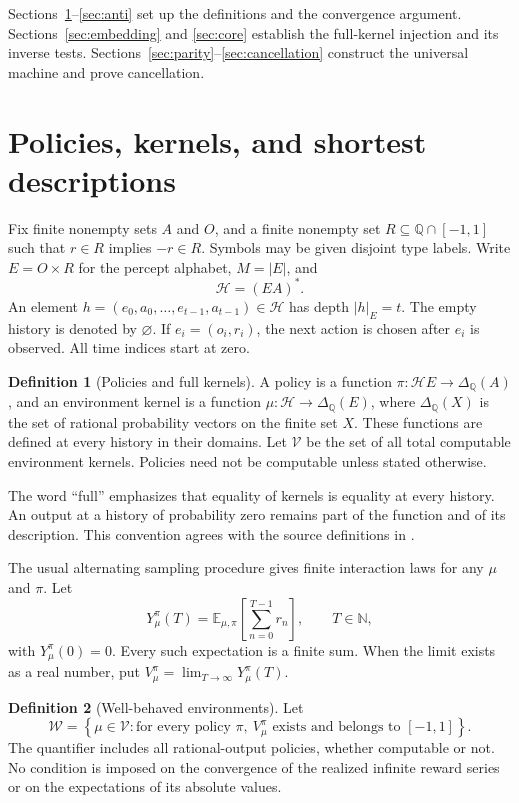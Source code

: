 \documentclass[11pt]{article}
\theoremstyle{definition}
\newtheorem{definition}{Definition}
\theoremstyle{remark}
\newcommand{\N}{\mathbb N}
\newcommand{\Q}{\mathbb Q}
\newcommand{\V}{\mathcal V}
\newcommand{\W}{\mathcal W}
\newcommand{\Hist}{\mathcal H}
\newcommand{\Dist}{\Delta_{\Q}}
\newcommand{\Exp}{\mathbb E}
\begin{document}
Sections~\ref{sec:framework}--\ref{sec:anti} set up the definitions and
the convergence argument.  Sections~\ref{sec:embedding} and
\ref{sec:core} establish the full-kernel injection and its inverse tests.
Sections~\ref{sec:parity}--\ref{sec:cancellation} construct the universal
machine and prove cancellation.

\section{Policies, kernels, and shortest descriptions}
\label{sec:framework}

Fix finite nonempty sets $A$ and $O$, and a finite nonempty set
$R\subseteq\Q\cap[-1,1]$ such that $r\in R$ implies $-r\in R$.
Symbols may be given disjoint type labels.  Write $E=O\times R$ for the
percept alphabet, $M=|E|$, and
\[
  \Hist=(EA)^*.
\]
An element
$h=(e_0,a_0,\ldots,e_{t-1},a_{t-1})\in\Hist$ has depth $|h|_E=t$.
The empty history is denoted by $\varnothing$.  If $e_i=(o_i,r_i)$,
the next action is chosen after $e_i$ is observed.  All time indices
start at zero.

\begin{definition}[Policies and full kernels]
\label{def:kernels}
A policy is a function $\pi:\Hist E\to\Dist(A)$, and an environment
kernel is a function $\mu:\Hist\to\Dist(E)$, where $\Dist(X)$ is the
set of rational probability vectors on the finite set $X$.  These
functions are defined at every history in their domains.  Let $\V$ be
the set of all total computable environment kernels.  Policies need not
be computable unless stated otherwise.
\end{definition}

The word ``full'' emphasizes that equality of kernels is equality at
every history.  An output at a history of probability zero remains part
of the function and of its description.  This convention agrees with
the source definitions in \cite{AlexanderHutter2021}.

The usual alternating sampling procedure gives finite interaction laws
for any $\mu$ and $\pi$.  Let
\begin{equation}
  Y_\mu^\pi(T)=\Exp_{\mu,\pi}\!\left[\sum_{n=0}^{T-1}r_n\right],
  \qquad T\in\N,
  \label{eq:finite-value}
\end{equation}
with $Y_\mu^\pi(0)=0$.  Every such expectation is a finite sum.  When
the limit exists as a real number, put
$V_\mu^\pi=\lim_{T\to\infty}Y_\mu^\pi(T)$.

\begin{definition}[Well-behaved environments]
\label{def:well-behaved}
Let
\[
  \W=\left\{\mu\in\V:
       \text{for every policy }\pi,
       \ V_\mu^\pi\text{ exists and belongs to }[-1,1]\right\}.
\]
The quantifier includes all rational-output policies, whether computable
or not.  No condition is imposed on the convergence of the realized
infinite reward series or on the expectations of its absolute values.
\end{definition}
\end{document}

